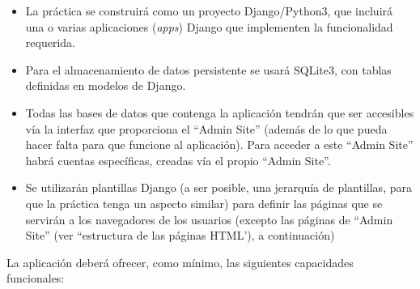 \begin{itemize}

\item La práctica se construirá como un proyecto Django/Python3, que incluirá una o varias aplicaciones (\emph{apps}) Django que implementen la funcionalidad requerida.

\item Para el almacenamiento de datos persistente se usará SQLite3, con tablas definidas en modelos de Django.

\item Todas las bases de datos que contenga la aplicación tendrán que ser accesibles vía la interfaz que proporciona el ``Admin Site'' (además de lo que pueda hacer falta para que funcione al aplicación). Para acceder a este ``Admin Site'' habrá cuentas específicas, creadas vía el propio ``Admin Site''.

\item Se utilizarán plantillas Django (a ser posible, una jerarquía de plantillas, para que la práctica tenga un aspecto similar) para definir las páginas que se servirán a los navegadores de los usuarios (excepto las páginas de ``Admin Site'' (ver ``estructura de las páginas HTML'), a continuación)

\end{itemize}

La aplicación deberá ofrecer, como mínimo, las siguientes capacidades funcionales:

